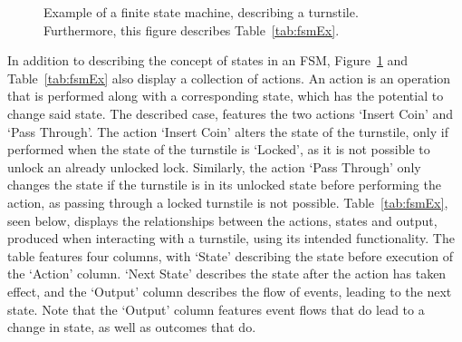 \begin{figure}[h]
  \centering
  \caption{Example of a finite state machine, describing a turnstile. Furthermore, this figure describes Table~\ref{tab:fsmEx}.}
  \label{fig:fsmEx}
\end{figure}
In addition to describing the concept of states in an FSM, Figure~\ref{fig:fsmEx} and Table~\ref{tab:fsmEx} also display a collection of actions. An action is an operation that is performed along with a corresponding state, which has the potential to change said state. The described case, features the two actions `Insert Coin' and `Pass Through'. The action `Insert Coin' alters the state of the turnstile, only if performed when the state of the turnstile is `Locked', as it is not possible to unlock an already unlocked lock. Similarly, the action `Pass Through' only changes the state if the turnstile is in its unlocked state before performing the action, as passing through a locked turnstile is not possible.
\newpage
\noindent
Table~\ref{tab:fsmEx}, seen below, displays the relationships between the actions, states and output, produced when interacting with a turnstile, using its intended functionality. The table features four columns, with `State' describing the state before execution of the `Action' column. `Next State' describes the state after the action has taken effect, and the `Output' column describes the flow of events, leading to the next state. Note that the `Output' column features event flows that do  lead to a change in state, as well as outcomes that do.
